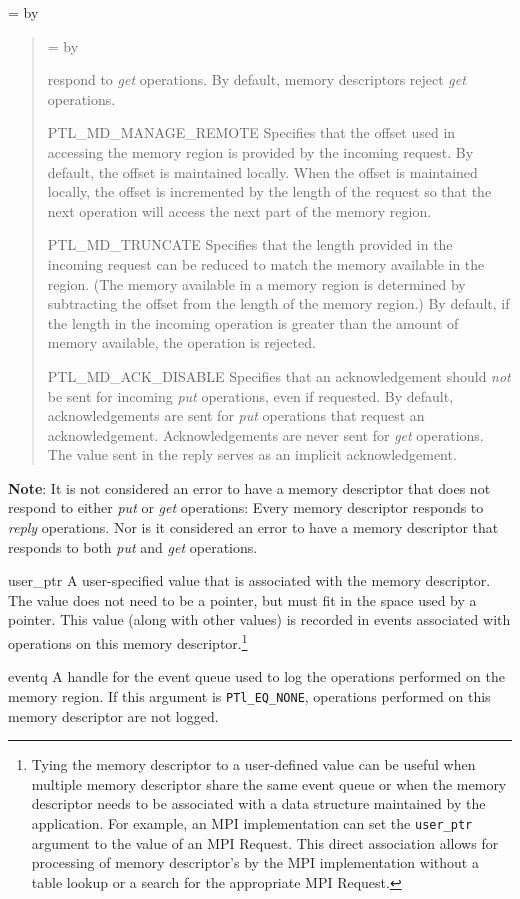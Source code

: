 \documentclass{sand-report}
\newcommand{\retlabel}[1]{\mbox{\texttt{#1}}\hfil}
\newenvironment{returns}%
  {\begin{list}{}%
      {\renewcommand{\makelabel}{\retlabel}%
        \topsep=0.0pt%
        \labelwidth=1.25in%
        \leftmargin=\labelwidth%
        \advance \leftmargin by \labelsep%
        \setlength{\itemsep}{.5\smallskipamount}%
        \setlength{\parsep}{0pt}}%
      }%
  {\end{list}}
\begin{document}
\begin{returns}
\begin{quote}
\begin{returns}
      respond to \emph{get} operations.  By default, memory
      descriptors reject \emph{get} operations.
    \item[PTL_MD_MANAGE_REMOTE] Specifies that the offset used in
      accessing the memory region is provided by the incoming request.
      By default, the offset is maintained locally.  When the offset
      is maintained locally, the offset is incremented by the length
      of the request so that the next operation will access the next
      part of the memory region.
    \item[PTL_MD_TRUNCATE] Specifies that the length provided in the
      incoming request can be reduced to match the memory available in
      the region.  (The memory available in a memory region is
      determined by subtracting the offset from the length of the
      memory region.)  By default, if the length in the incoming
      operation is greater than the amount of memory available, the
      operation is rejected.
    \item[PTL_MD_ACK_DISABLE] Specifies that an acknowledgement should
      \emph{not} be sent for incoming \emph{put} operations, even if
      requested.  By default, acknowledgements are sent for \emph{put}
      operations that request an acknowledgement.  Acknowledgements
      are never sent for \emph{get} operations.  The value sent in the
      reply serves as an implicit acknowledgement.
    \end{returns}
  \end{quote}
  
  \textbf{Note}: It is not considered an error to have a memory
  descriptor that does not respond to either \emph{put} or \emph{get}
  operations: Every memory descriptor responds to \emph{reply}
  operations.  Nor is it considered an error to have a memory
  descriptor that responds to both \emph{put} and \emph{get}
  operations.
\item[user_ptr] A user-specified value that is associated with the
  memory descriptor.  The value does not need to be a pointer, but
  must fit in the space used by a pointer.  This value (along with
  other values) is recorded in events associated with operations on
  this memory descriptor.\footnote{Tying the memory descriptor to a
  user-defined value can be useful when multiple memory descriptor
  share the same event queue or when the memory descriptor needs to be
  associated with a data structure maintained by the application.  For
  example, an MPI implementation can set the \texttt{user_ptr}
  argument to the value of an MPI Request.  This direct association
  allows for processing of memory descriptor's by the MPI
  implementation without a table lookup or a search for the
  appropriate MPI Request.}
\item[eventq] A handle for the event queue used to log the operations
  performed on the memory region.  If this argument is
  \texttt{PTl_EQ_NONE}, operations performed on this memory descriptor
  are not logged.
\end{returns}
\end{document}

